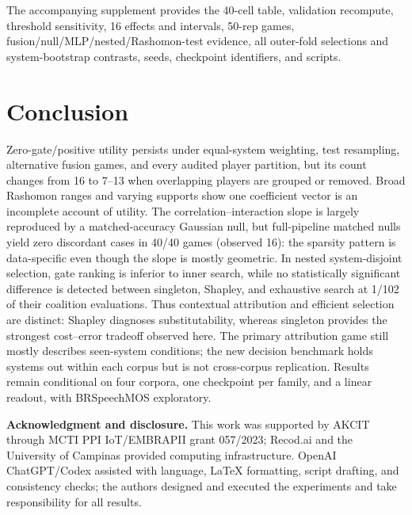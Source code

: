 \documentclass{article}
\begin{document}
The accompanying supplement provides the 40-cell table, validation recompute,
threshold sensitivity, 16 effects and intervals, 50-rep games,
fusion/null/MLP/nested/Rashomon-test evidence, all outer-fold selections and
system-bootstrap contrasts, seeds, checkpoint identifiers, and scripts.
\section{Conclusion}
\label{sec:conclusion}

Zero-gate/positive utility persists under equal-system weighting, test
resampling, alternative fusion games, and every audited player partition, but
its count changes from 16 to 7--13 when overlapping players are grouped or
removed. Broad Rashomon ranges and varying supports show one coefficient vector
is an incomplete account of utility. The correlation--interaction slope is largely
reproduced by a matched-accuracy Gaussian null, but full-pipeline matched nulls
yield zero discordant cases in 40/40 games (observed 16): the sparsity pattern
is data-specific even though the slope is mostly geometric. In nested
system-disjoint selection, gate ranking is inferior to inner search, while
no statistically significant difference is detected between singleton, Shapley,
and exhaustive search at 1/102 of their coalition evaluations. Thus contextual
attribution and efficient selection are distinct:
Shapley diagnoses substitutability, whereas singleton provides the strongest
cost--error tradeoff observed here. The primary attribution game still mostly
describes seen-system conditions; the new decision benchmark holds systems out
within each corpus but is not cross-corpus replication. Results remain
conditional on four corpora, one checkpoint per family, and a linear readout,
with BRSpeechMOS exploratory.

\noindent\textbf{Acknowledgment and disclosure.} This work was supported by AKCIT
through MCTI PPI IoT/EMBRAPII grant 057/2023; Recod.ai and the University of
Campinas provided computing infrastructure. OpenAI ChatGPT/Codex assisted with
language, LaTeX formatting, script drafting, and consistency checks; the authors
designed and executed the experiments and take responsibility for all results.
\clearpage
\balance


\end{document}
